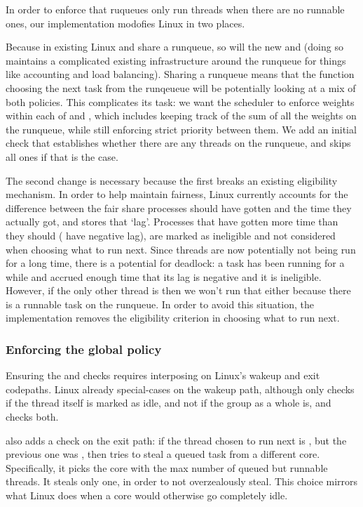 In order to enforce that ruqueues only run \schedbe{} threads when there are no
runnable \schednormal{} ones, our implementation modofies Linux in two places. 

Because in existing Linux \schedidle{} and \schednormal{} share a runqueue, so
will the new \schedbe{} and \schednormal{} (doing so maintains a complicated
existing infrastructure around the runqueue for things like accounting and load
balancing). Sharing a runqueue means that the function choosing the next task
from the runqeueue will be potentially looking at a mix of both policies. This
complicates its task: we want the scheduler to enforce weights within each of
\schedbe{} and \schednormal{}, which includes keeping track of the sum of all
the weights on the runqueue, while still enforcing strict priority between them.
We add an initial check that establishes whether there are any \schednormal{}
threads on the runqueue, and skips all \schedbe{} ones if that is the case.

The second change is necessary because the first breaks an existing eligibility
mechanism. In order to help maintain fairness, Linux currently accounts for the
difference between the fair share processes should have gotten and the time they
actually got, and stores that `lag'. Processes that have gotten more time than
they should (\ie{} have negative lag), are marked as ineligible and not
considered when choosing what to run next. Since \schedbe{} threads are now
potentially not being run for a long time, there is a potential for deadlock: a
\schednormal{} task has been running for a while and accrued enough time that
its lag is negative and it is ineligible. However, if the only other thread is
\schedbe{} then we won't run that either because there is a runnable
\schednormal{} task on the runqueue. In order to avoid this situation, the
implementation removes the eligibility criterion in choosing what to run
next.


\subsubsection{Enforcing the global policy}\label{ss:implementation:exit}

Ensuring the \entry{} and \exit{} checks requires interposing on Linux's wakeup
and exit codepaths. Linux already special-cases on the wakeup path, although
only checks if the thread itself is marked as idle, and not if the group as a
whole is, and \schedbe{} checks both.

\schedbe{} also adds a check on the exit path: if the thread chosen to run next
is \schedbe{}, but the previous one was \schednormal{}, then \schedbe{} tries to
steal a queued \schednormal{} task from a different core. Specifically, it picks
the core with the max number of queued but runnable \schednormal{} threads. It
steals only one, in order to not overzealously steal. This choice mirrors what
Linux does when a core would otherwise go completely idle.